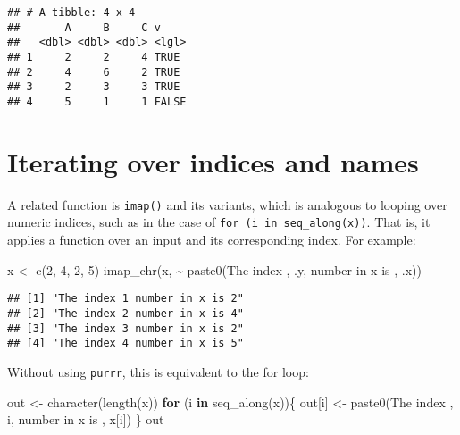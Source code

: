 \documentclass[
]{book}
\newenvironment{Shaded}{\begin{snugshade}}{\end{snugshade}}
\newcommand{\ControlFlowTok}[1]{\textcolor[rgb]{0.13,0.29,0.53}{\textbf{#1}}}
\newcommand{\DecValTok}[1]{\textcolor[rgb]{0.00,0.00,0.81}{#1}}
\newcommand{\FunctionTok}[1]{\textcolor[rgb]{0.00,0.00,0.00}{#1}}
\newcommand{\NormalTok}[1]{#1}
\newcommand{\OtherTok}[1]{\textcolor[rgb]{0.56,0.35,0.01}{#1}}
\newcommand{\SpecialCharTok}[1]{\textcolor[rgb]{0.00,0.00,0.00}{#1}}
\newcommand{\StringTok}[1]{\textcolor[rgb]{0.31,0.60,0.02}{#1}}
\begin{document}
\begin{verbatim}
## # A tibble: 4 x 4
##       A     B     C v    
##   <dbl> <dbl> <dbl> <lgl>
## 1     2     2     4 TRUE 
## 2     4     6     2 TRUE 
## 3     2     3     3 TRUE 
## 4     5     1     1 FALSE
\end{verbatim}

\hypertarget{iterating-over-indices-and-names}{%
\section{Iterating over indices and names}\label{iterating-over-indices-and-names}}

A related function is \texttt{imap()} and its variants, which is analogous to looping over numeric indices, such as in the case of \texttt{for\ (i\ in\ seq\_along(x))}. That is, it applies a function over an input and its corresponding index. For example:

\begin{Shaded}
\begin{Highlighting}[]
\NormalTok{x }\OtherTok{\textless{}{-}} \FunctionTok{c}\NormalTok{(}\DecValTok{2}\NormalTok{, }\DecValTok{4}\NormalTok{, }\DecValTok{2}\NormalTok{, }\DecValTok{5}\NormalTok{)}
\FunctionTok{imap\_chr}\NormalTok{(x, }\SpecialCharTok{\textasciitilde{}} \FunctionTok{paste0}\NormalTok{(}\StringTok{\textquotesingle{}The index \textquotesingle{}}\NormalTok{, .y, }\StringTok{\textquotesingle{} number in x is \textquotesingle{}}\NormalTok{, .x))}
\end{Highlighting}
\end{Shaded}

\begin{verbatim}
## [1] "The index 1 number in x is 2"
## [2] "The index 2 number in x is 4"
## [3] "The index 3 number in x is 2"
## [4] "The index 4 number in x is 5"
\end{verbatim}

Without using \texttt{purrr}, this is equivalent to the for loop:

\begin{Shaded}
\begin{Highlighting}[]
\NormalTok{out }\OtherTok{\textless{}{-}} \FunctionTok{character}\NormalTok{(}\FunctionTok{length}\NormalTok{(x))}
\ControlFlowTok{for}\NormalTok{ (i }\ControlFlowTok{in} \FunctionTok{seq\_along}\NormalTok{(x))\{}
\NormalTok{  out[i] }\OtherTok{\textless{}{-}} \FunctionTok{paste0}\NormalTok{(}\StringTok{\textquotesingle{}The index \textquotesingle{}}\NormalTok{, i, }\StringTok{\textquotesingle{} number in x is \textquotesingle{}}\NormalTok{, x[i])}
\NormalTok{\}}
\NormalTok{out}
\end{Highlighting}
\end{Shaded}
\end{document}
